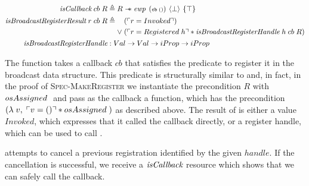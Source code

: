 \begin{align*}
  \gsIsCb{}\; cb\; R                            & \triangleq R \wand \ewp{cb\; ()}{\bot}{\top}                                                                    \\
  \emph{isBroadcastRegisterResult}\; r\; cb\; R & \triangleq \begin{aligned}[t]
                                                                      & (\ulcorner r = Invoked \urcorner)                                                           \\
                                                               \vee\; & (\ulcorner r = Registered\; h \urcorner \ast \emph{isBroadcastRegisterHandle}\; h\; cb\; R)
                                                             \end{aligned} \\
  \emph{isBroadcastRegisterHandle}              & : Val \to Val \to iProp \to iProp
\end{align*}


The function  takes a callback \(cb\) that satisfies the \gsIsCb{} predicate to register it in the broadcast data structure.
This predicate is structurally similar to \gsIsWaker{} and, in fact, in the proof of \textsc{Spec-MakeRegister} we instantiate the precondition \(R\) with \(osAssigned\;\) and pass as the callback a  function, which has the precondition \((\lambda\; v,\; \ulcorner v = () \urcorner \ast osAssigned\;)\) as described above.
The result of  is either a value \(Invoked\), which expresses that it called the callback directly, or a register handle, which can be used to call .

 attempts to cancel a previous registration identified by the given \(handle\).
If the cancellation is successful, we receive a \(\emph{isCallback}{}\) resource which shows that we can safely call the callback.


